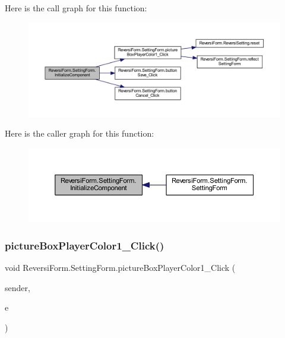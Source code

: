 Here is the call graph for this function\+:
\nopagebreak
\begin{figure}[H]
\begin{center}
\leavevmode
\includegraphics[width=350pt]{class_reversi_form_1_1_setting_form_a9b663029f37a28044ff2300fc66dc859_cgraph}
\end{center}
\end{figure}
Here is the caller graph for this function\+:
\nopagebreak
\begin{figure}[H]
\begin{center}
\leavevmode
\includegraphics[width=350pt]{class_reversi_form_1_1_setting_form_a9b663029f37a28044ff2300fc66dc859_icgraph}
\end{center}
\end{figure}
\mbox{\label{class_reversi_form_1_1_setting_form_a71422ab30aabb52bdc6f25b5e84aefea}} 
\subsubsection{\texorpdfstring{picture\+Box\+Player\+Color1\+\_\+\+Click()}{pictureBoxPlayerColor1\_Click()}}
{\footnotesize\ttfamily void Reversi\+Form.\+Setting\+Form.\+picture\+Box\+Player\+Color1\+\_\+\+Click (\begin{DoxyParamCaption}\item[{object}]{sender,  }\item[{Event\+Args}]{e }\end{DoxyParamCaption})\hspace{0.3cm}{\ttfamily [private]}}



